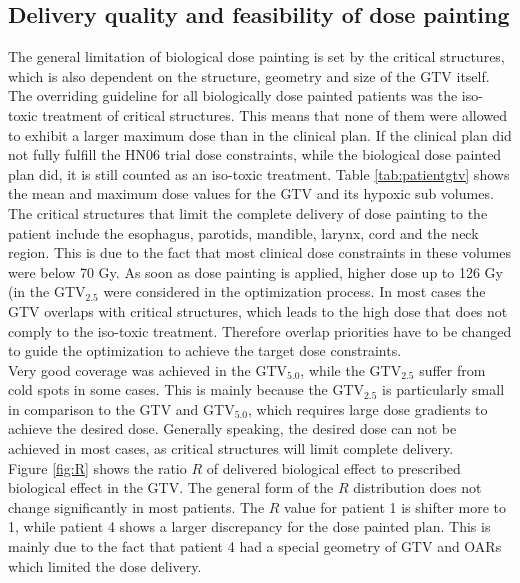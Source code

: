 \subsection{Delivery quality and feasibility of dose painting}The general limitation of biological dose painting is set by the critical structures, which is also dependent on the structure, geometry and size of the GTV itself. The overriding guideline for all biologically dose painted patients was the iso-toxic treatment of critical structures. This means that none of them were allowed to exhibit a larger maximum dose than in the clinical plan. If the clinical plan did not fully fulfill the HN06 trial dose constraints, while the biological dose painted plan did, it is still counted as an iso-toxic treatment. Table \ref{tab:patientgtv} shows the mean and maximum dose values for the GTV and its hypoxic sub volumes. The critical structures that limit the complete delivery of dose painting to the patient include the esophagus, parotids, mandible, larynx, cord and the neck region. This is due to the fact that most clinical dose constraints in these volumes were below 70 Gy. As soon as dose painting is applied, higher dose up to 126 Gy (in the GTV$_{2.5}$ were considered in the optimization process. In most cases the GTV overlaps with critical structures, which leads to the high dose that does not comply to the iso-toxic treatment. Therefore overlap priorities have to be changed to guide the optimization to achieve the target dose constraints.\\Very good coverage was achieved in the GTV$_{5.0}$, while the GTV$_{2.5}$ suffer from cold spots in some cases. This is mainly because the GTV$_{2.5}$ is particularly small in comparison to the GTV and GTV$_{5.0}$, which requires large dose gradients to achieve the desired dose. Generally speaking, the desired dose can not be achieved in most cases, as critical structures will limit complete delivery.\\Figure \ref{fig:R} shows the ratio $R$ of delivered biological effect to prescribed biological effect in the GTV. The general form of the $R$ distribution does not change significantly in most patients. The $R$ value for patient 1 is shifter more to 1, while patient 4 shows a larger discrepancy for the dose painted plan. This is mainly due to the fact that patient 4 had a special geometry of GTV and OARs which limited the dose delivery.
\begin{sidewaysfigure}[p]
\centering
{}
\caption{Ratio $R$ of delivered biological effect in the GTV divided by the prescribed effect. If $R>1$, the voxel is over dose, while $R<1$ can be interpreted as under dose. $R$ distributions show clinical plan (green) and dose painted plan (red).}
\label{fig:R}
\end{sidewaysfigure}
